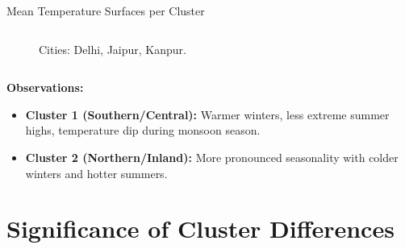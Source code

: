 \documentclass[svgnames, 12pt]{beamer}
\begin{document}
\begin{frame}{Mean Temperature Surfaces per Cluster}
\begin{columns}[T]
\begin{column}{0.5\textwidth}
\begin{figure}
        \caption*{\tiny Cities: Delhi, Jaipur, Kanpur.}
      \end{figure}
    \end{column}
  \end{columns}
  \textbf{Observations:}
  \begin{itemize}
    \item \textbf{Cluster 1 (Southern/Central):} Warmer winters, less extreme summer highs, temperature dip during monsoon season.
    \item \textbf{Cluster 2 (Northern/Inland):} More pronounced seasonality with colder winters and hotter summers.
  \end{itemize}
\end{frame}

\section{Significance of Cluster Differences}
\end{document}
